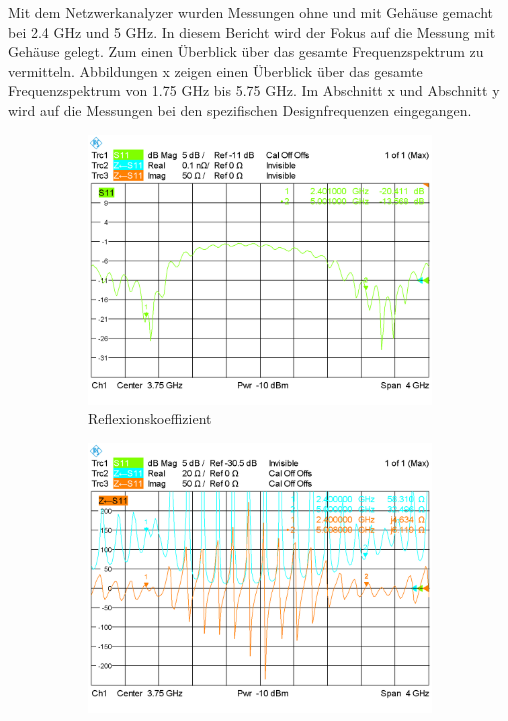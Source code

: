 Mit dem Netzwerkanalyzer wurden Messungen ohne und mit Gehäuse gemacht bei 2.4 GHz und 5 GHz. In diesem Bericht wird der Fokus  auf die Messung mit Gehäuse gelegt. Zum einen Überblick über das gesamte Frequenzspektrum zu vermitteln.
Abbildungen x zeigen einen Überblick über das gesamte Frequenzspektrum von 1.75 GHz bis 5.75 GHz.  Im Abschnitt x und Abschnitt y wird auf die Messungen bei den spezifischen Designfrequenzen eingegangen.

\begin{figure}[h!]
	\begin{center}
		\begin{subfigure}[t]{0.49\textwidth}
			\begin{center}
				\includegraphics[width=1\textwidth]{../fig/plt/S11_WITH_FULL.PNG}
				\caption{Reflexionskoeffizient}
				\label{fig:S11_with_full}
			\end{center}
		\end{subfigure}
		\begin{subfigure}[t]{0.49\textwidth}
			\begin{center}
				\includegraphics[width=1\textwidth]{../fig/plt/IMP_WITH_FULL.PNG}

\end{center}
\end{subfigure}
\end{center}
\end{figure}
